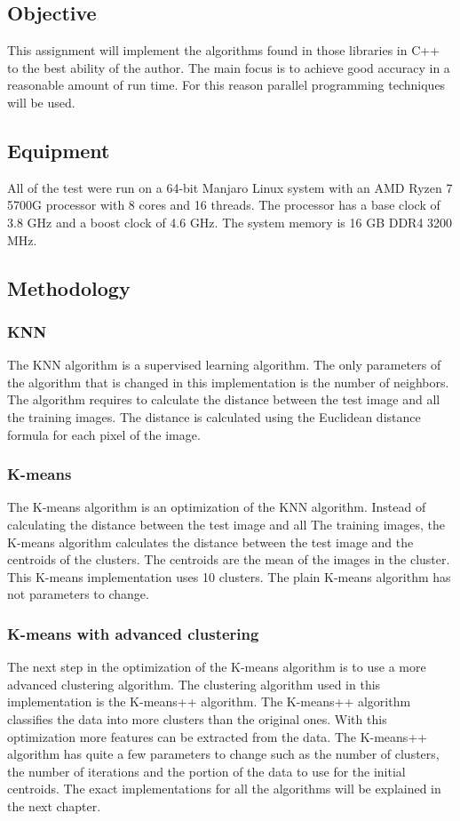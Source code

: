 \subsection{Objective}

This assignment will implement the algorithms found in those libraries in C++ to the best ability of the author. The main focus
is to achieve good accuracy in a reasonable amount of run time. For this reason parallel programming techniques will be used.

\subsection{Equipment}

All of the test were run on a 64-bit Manjaro Linux system with an AMD Ryzen 7 5700G processor with 8 cores and 16 threads. The
processor has a base clock of 3.8 GHz and a boost clock of 4.6 GHz. The system memory is 16 GB DDR4 3200 MHz.

\subsection{Methodology}
\subsubsection{KNN}

The KNN algorithm is a supervised learning algorithm. The only parameters of the algorithm that is changed in this implementation
is the number of neighbors. The algorithm requires to calculate the distance between the test image and all the training images. The
distance is calculated using the Euclidean distance formula for each pixel of the image.

\subsubsection{K-means}

The K-means algorithm is an optimization of the KNN algorithm. Instead of calculating the distance between the test image and all The
training images, the K-means algorithm calculates the distance between the test image and the centroids of the clusters. The centroids
are the mean of the images in the cluster. This K-means implementation uses 10 clusters. The plain K-means algorithm has not parameters
to change.


\subsubsection{K-means with advanced clustering}

The next step in the optimization of the K-means algorithm is to use a more advanced clustering algorithm. The clustering algorithm used
in this implementation is the K-means++ algorithm. The K-means++ algorithm classifies the data into more clusters than the original ones.
With this optimization more features can be extracted from the data. The K-means++ algorithm has quite a few parameters to change such as
the number of clusters, the number of iterations and the portion of the data to use for the initial centroids. The exact implementations 
for all the algorithms will be explained in the next chapter.